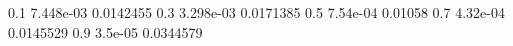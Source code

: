 0.1 7.448e-03 0.0142455
0.3 3.298e-03 0.0171385
0.5 7.54e-04 0.01058
0.7 4.32e-04 0.0145529
0.9 3.5e-05 0.0344579